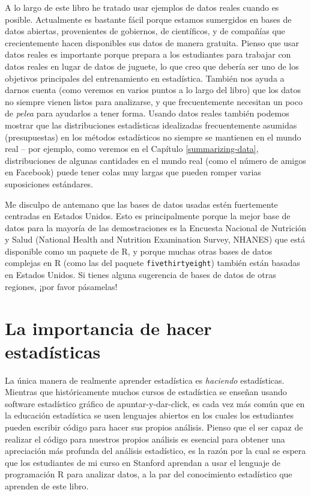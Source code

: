 \documentclass[
  12pt,
]{book}
\begin{document}
A lo largo de este libro he tratado usar ejemplos de datos reales cuando es posible. Actualmente es bastante fácil porque estamos sumergidos en bases de datos abiertas, provenientes de gobiernos, de científicos, y de compañías que crecientemente hacen disponibles sus datos de manera gratuita. Pienso que usar datos reales es importante porque prepara a los estudiantes para trabajar con datos reales en lugar de datos de juguete, lo que creo que debería ser uno de los objetivos principales del entrenamiento en estadística. También nos ayuda a darnos cuenta (como veremos en varios puntos a lo largo del libro) que los datos no siempre vienen listos para analizarse, y que frecuentemente necesitan un poco de \emph{pelea} para ayudarlos a tener forma. Usando datos reales también podemos mostrar que las distribuciones estadísticas idealizadas frecuentemente asumidas (presupuestas) en los métodos estadísticos no siempre se mantienen en el mundo real -- por ejemplo, como veremos en el Capítulo \ref{summarizing-data}, distribuciones de algunas cantidades en el mundo real (como el número de amigos en Facebook) puede tener colas muy largas que pueden romper varias suposiciones estándares.

Me disculpo de antemano que las bases de datos usadas estén fuertemente centradas en Estados Unidos. Esto es principalmente porque la mejor base de datos para la mayoría de las demostraciones es la Encuesta Nacional de Nutrición y Salud (National Health and Nutrition Examination Survey, NHANES) que está disponible como un paquete de R, y porque muchas otras bases de datos complejas en R (como las del paquete \texttt{fivethirtyeight}) también están basadas en Estados Unidos. Si tienes alguna sugerencia de bases de datos de otras regiones, ¡por favor pásamelas!

\hypertarget{la-importancia-de-hacer-estaduxedsticas}{%
\section{La importancia de hacer estadísticas}\label{la-importancia-de-hacer-estaduxedsticas}}

La única manera de realmente aprender estadística es \emph{haciendo} estadísticas. Mientras que históricamente muchos cursos de estadística se enseñan usando software estadístico gráfico de apuntar-y-dar-click, es cada vez más común que en la educación estadística se usen lenguajes abiertos en los cuales los estudiantes pueden escribir código para hacer sus propios análisis. Pienso que el ser capaz de realizar el código para nuestros propios análisis es esencial para obtener una apreciación más profunda del análisis estadístico, es la razón por la cual se espera que los estudiantes de mi curso en Stanford aprendan a usar el lenguaje de programación R para analizar datos, a la par del conocimiento estadístico que aprenden de este libro.
\end{document}
